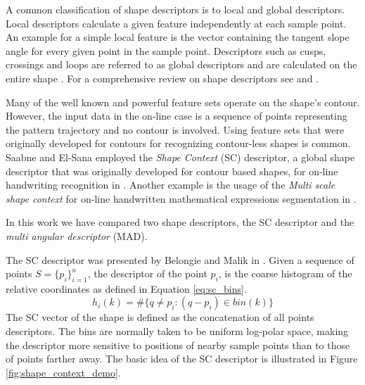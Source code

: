 \iftoggle{edit-mode}{\hspace{0pt}\marginpar{Shape descriptors types}}{}
A common classification of shape descriptors is to local and global descriptors. 
Local descriptors calculate a given feature independently at each sample point. 
An example for a simple local feature is the vector containing the tangent slope angle for every given point in the sample point.
Descriptors such as cusps, crossings and loops are referred to as global descriptors and are calculated on the entire shape \cite{hu1997combining}. 
For a comprehensive review on shape descriptors see \cite{zhang2004review} and \cite{yang2008survey}.

\iftoggle{edit-mode}{\hspace{0pt}\marginpar{Using off-line shape descriptors for on-line HWR}}{}
Many of the well known and powerful feature sets operate on the shape's contour.  
However, the input data in the on-line case is a sequence of points representing the pattern trajectory and no contour is involved. 
Using feature sets that were originally developed for contours for recognizing contour-less shapes is common. 
Saabne and El-Sana employed the \emph{Shape Context} (SC) descriptor, a global shape descriptor that was originally developed for contour based shapes, for on-line handwriting recognition in \cite{saabni2009hierarchical}. 
Another example is the usage of the \emph{Multi scale shape context} for on-line handwritten mathematical expressions segmentation in \cite{husegmenting}. 

\iftoggle{edit-mode}{\hspace{0pt}\marginpar{Selected Descriptors}}{}
In this work we have compared two shape descriptors, the SC descriptor and the \emph{multi angular descriptor} (MAD). 

\iftoggle{edit-mode}{\hspace{0pt}\marginpar{Shape Context}}{}
The SC descriptor was presented by Belongie and Malik in \cite{belongie2002shape}.
Given a sequence of points $S=\{p_i\}_{i=1}^n$, the descriptor of the point ${p_i}$, is the coarse histogram of the relative coordinates as defined in Equation \ref{eq:sc_bins}.
\begin{equation}
{h_i}(k) = \# \{q \ne p_i:(q - p_i) \in bin(k) \}
\label{eq:sc_bins}
\end{equation}
The SC vector of the shape is defined as the concatenation of all points descriptors.
The bins are normally taken to be uniform log-polar space, making the descriptor more sensitive to positions of nearby sample points than to those of points farther away. 
The basic idea of the SC descriptor is illustrated in Figure \ref{fig:shape_context_demo}. 

